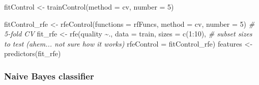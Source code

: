 \documentclass[
]{article}
\newenvironment{Shaded}{\begin{snugshade}}{\end{snugshade}}
\newcommand{\AttributeTok}[1]{\textcolor[rgb]{0.77,0.63,0.00}{#1}}
\newcommand{\CommentTok}[1]{\textcolor[rgb]{0.56,0.35,0.01}{\textit{#1}}}
\newcommand{\DecValTok}[1]{\textcolor[rgb]{0.00,0.00,0.81}{#1}}
\newcommand{\FunctionTok}[1]{\textcolor[rgb]{0.00,0.00,0.00}{#1}}
\newcommand{\NormalTok}[1]{#1}
\newcommand{\OtherTok}[1]{\textcolor[rgb]{0.56,0.35,0.01}{#1}}
\newcommand{\SpecialCharTok}[1]{\textcolor[rgb]{0.00,0.00,0.00}{#1}}
\newcommand{\StringTok}[1]{\textcolor[rgb]{0.31,0.60,0.02}{#1}}
\begin{document}
\begin{Shaded}
\begin{Highlighting}[]
\NormalTok{fitControl }\OtherTok{\textless{}{-}} \FunctionTok{trainControl}\NormalTok{(}\AttributeTok{method =} \StringTok{\textquotesingle{}cv\textquotesingle{}}\NormalTok{, }\AttributeTok{number =} \DecValTok{5}\NormalTok{)}
\end{Highlighting}
\end{Shaded}

\begin{Shaded}
\begin{Highlighting}[]
\NormalTok{fitControl\_rfe }\OtherTok{\textless{}{-}} \FunctionTok{rfeControl}\NormalTok{(}\AttributeTok{functions =}\NormalTok{ rfFuncs, }\AttributeTok{method =} \StringTok{\textquotesingle{}cv\textquotesingle{}}\NormalTok{, }\AttributeTok{number =} \DecValTok{5}\NormalTok{) }\CommentTok{\# 5{-}fold CV}
\NormalTok{fit\_rfe }\OtherTok{\textless{}{-}} \FunctionTok{rfe}\NormalTok{(quality }\SpecialCharTok{\textasciitilde{}}\NormalTok{., }\AttributeTok{data =}\NormalTok{ train,}
               \AttributeTok{sizes =} \FunctionTok{c}\NormalTok{(}\DecValTok{1}\SpecialCharTok{:}\DecValTok{10}\NormalTok{),  }\CommentTok{\# subset sizes to test (ahem... not sure how it works)}
               \AttributeTok{rfeControl =}\NormalTok{ fitControl\_rfe)}
\NormalTok{features }\OtherTok{\textless{}{-}} \FunctionTok{predictors}\NormalTok{(fit\_rfe)}
\end{Highlighting}
\end{Shaded}

\hypertarget{naive-bayes-classifier}{%
\subsubsection{Naive Bayes classifier}\label{naive-bayes-classifier}}

\begin{Shaded}
\end{Shaded}
\end{document}
